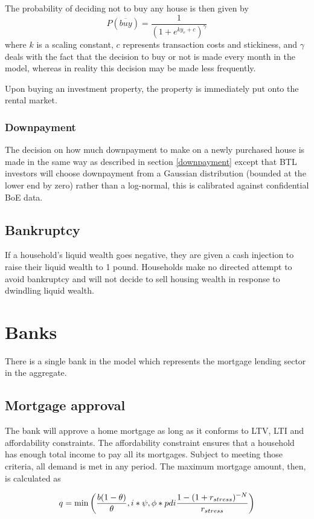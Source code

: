 \documentclass{article}
\begin{document}
The probability of deciding not to buy any house is then given by
\[
P(\overline{buy}) = \frac{1}{(1 + e^{ky_e+c})^\gamma}
\]
where $k$ is a scaling constant, $c$ represents transaction costs and stickiness, and $\gamma$ deals with the fact that the decision to buy or not is made every month in the model, whereas in reality this decision may be made less frequently.

Upon buying an investment property, the property is immediately put onto the rental market.

\subsubsection{Downpayment}
The decision on how much downpayment to make on a newly purchased house is made in the same way as described in section \ref{downpayment} except that BTL investors will choose downpayment from a Gaussian distribution (bounded at the lower end by zero) rather than a log-normal, this is calibrated against confidential BoE data.

\subsection{Bankruptcy}
If a household's liquid wealth goes negative, they are given a cash injection to raise their liquid wealth to 1 pound. Households make no directed attempt to avoid bankruptcy and will not decide to sell housing wealth in response to dwindling liquid wealth.

\section{Banks}

There is a single bank in the model which represents the mortgage lending
sector in the aggregate.

\subsection{Mortgage approval}
The bank will approve a home mortgage as long as it
conforms to LTV, LTI and affordability constraints. The affordability
constraint ensures that a household has enough total income to pay all its
mortgages. Subject to meeting those criteria, all demand is met in any
period. The maximum mortgage amount, then, is calculated as

\bigskip 
\begin{equation}
q=\min \left( \frac{b(1-\theta )}{\theta },i\ast \psi ,\phi \ast pdi\frac{%
1-(1+r_{stress})^{-N}}{r_{stress}}\right)
\end{equation}
\end{document}

